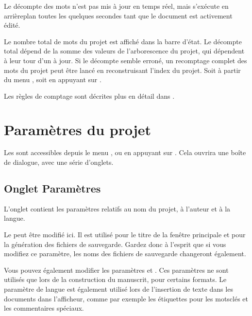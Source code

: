 \documentclass[a4paper,11pt,french]{sphinxmanual}
\begin{document}
\sphinxAtStartPar
Le décompte des mots n’est pas mis à jour en temps réel, mais s’exécute en arrière\sphinxhyphen{}plan toutes les quelques secondes tant que le document est activement édité.

\sphinxAtStartPar
Le nombre total de mots du projet est affiché dans la barre d’état. Le décompte total dépend de la somme des valeurs de l’arborescence du projet, qui dépendent à leur tour d’un {\hyperref[\detokenize{int_glossary:term-Project-Index}]{}} à jour. Si le décompte semble erroné, un recomptage complet des mots du projet peut être lancé en reconstruisant l’index du projet. Soit à partir du menu , soit en appuyant sur .

\sphinxAtStartPar
Les règles de comptage sont décrites plus en détail dans {\hyperref[\detokenize{more_counting:a-counting}]{}}.


\section{Paramètres du projet}
\label{\detokenize{project_overview:project-settings}}\label{\detokenize{project_overview:a-proj-settings}}
\sphinxAtStartPar
Les  sont accessibles depuis le menu , ou en appuyant sur . Cela ouvrira une boîte de dialogue, avec une série d’onglets.


\subsection{Onglet Paramètres}
\label{\detokenize{project_overview:settings-tab}}
\sphinxAtStartPar
L’onglet  contient les paramètres relatifs au nom du projet, à l’auteur et à la langue.

\sphinxAtStartPar
Le  peut être modifié ici. Il est utilisé pour le titre de la fenêtre principale et pour la génération des fichiers de sauvegarde. Gardez donc à l’esprit que si vous modifiez ce paramètre, les noms des fichiers de sauvegarde changeront également.

\sphinxAtStartPar
Vous pouvez également modifier les paramètres  et . Ces paramètres ne sont utilisés que lors de la construction du manuscrit, pour certains formats. Le paramètre de langue est également utilisé lors de l’insertion de texte dans les documents dans l’afficheur, comme par exemple les étiquettes pour les mots\sphinxhyphen{}clés et les commentaires spéciaux.
\end{document}
